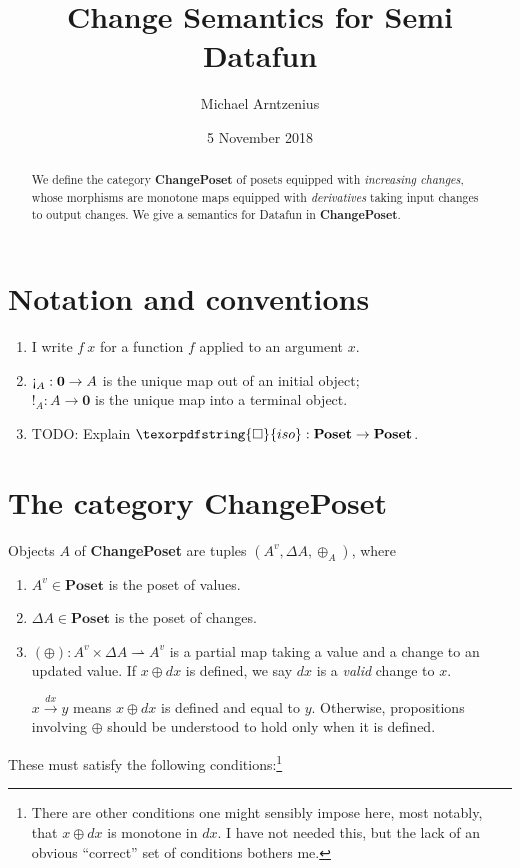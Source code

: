 \documentclass[]{rntz}
\title{Change Semantics for Semi\naive{} Datafun}
\author{Michael Arntzenius}
\date{5 November 2018}
\newcommand\todo[1]{{\color{Rhodamine}#1}}
\newcommand\cat\textbf
\newcommand\CP{\cat{ChangePoset}}
\newcommand\Poset{\cat{Poset}}
\newcommand\initO{\ensuremath{\mathbold{0}}}
\newcommand\initE{\mathop{\text{\textexclamdown}}}
\newcommand\termI{\mathop{!}}
\newcommand\D\Delta
\newcommand\x\times
\newcommand\iso{\texorpdfstring{\ensuremath{\square}}{iso}}
\newcommand\vals[1]{#1^v} %
\newcommand\chgs[1]{\D{#1}}
\newcommand\validarrow\to
\newcommand\vld[3]{{#2 \mathrel{\overset{#1}{\validarrow}} #3}}
\begin{document}
\maketitle

\begin{abstract}
  We define the category \CP{} of posets equipped with \emph{increasing
    changes}, whose morphisms are monotone maps equipped with \emph{derivatives}
  taking input changes to output changes. We give a semantics for Datafun in
  \CP.
\end{abstract}


\section{Notation and conventions}

\begin{enumerate}
\item I write $f~x$ for a function $f$ applied to an argument $x$.
\item $\initE_A : \initO \to A$ is the unique map out of an initial object;\\
  $\termI_A : A \to \initO$ is the unique map into a terminal object.
\item \todo{TODO: Explain $\iso : \Poset \to \Poset$.}
\end{enumerate}


\section{The category \CP}

\newcommand\pto\rightharpoonup
\newcommand\upd\oplus

Objects $A$ of \CP{} are tuples $(\vals A, \chgs A, \upd_A)$, where
\begin{enumerate}
\item $\vals A \in \Poset$ is the poset of values.
\item $\chgs A \in \Poset$ is the poset of changes.
\item $(\upd) : \vals A \x \chgs A \pto \vals A$ is a partial map
  taking a value and a change to an updated value. If $x \upd dx$ is defined, we
  say $dx$ is a \emph{valid} change to $x$.

  $\vld{dx} x y$ means $x \upd dx$ is defined and equal to $y$. Otherwise,
  propositions involving $\upd$ should be understood to hold only when it is
  defined.
\end{enumerate}

\noindent
These must satisfy the following conditions:\footnote{There are other conditions
  one might sensibly impose here, most notably, that $x \upd dx$ is monotone in
  $dx$. I have not needed this, but the lack of an obvious ``correct'' set of
  conditions bothers me.}
\end{document}
